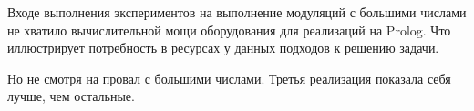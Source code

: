 		Входе выполнения экспериментов на выполнение модуляций с большими числами не хватило вычислительной мощи
		оборудования для реализаций на Prolog. Что иллюстрирует потребность в ресурсах у данных подходов
		к решению задачи.

		Но не смотря на провал с большими числами. Третья реализация показала себя лучше, чем остальные.







